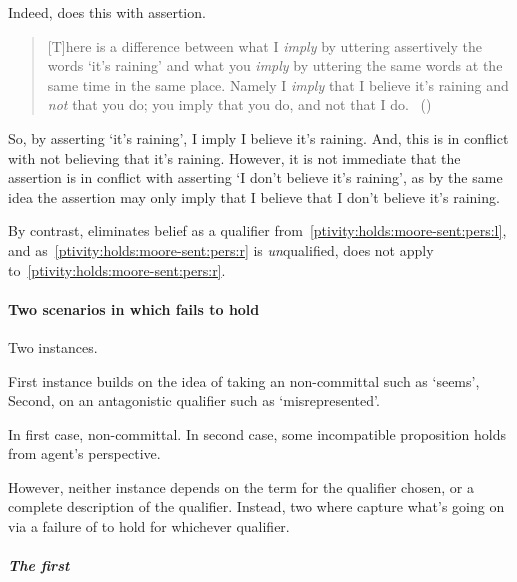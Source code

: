 \begin{note}
{    Indeed, \citeauthor{Moore:1993wk} does this with assertion.
    \begin{quote}
      [T]here is a difference between what I \emph{imply} by uttering assertively the words `it's raining' and what you \emph{imply} by uttering the same words at the same time in the same place.
      Namely I \emph{imply} that I believe it's raining and \emph{not} that you do; you imply that you do, and not that I do.%
      \mbox{ }\hfill\mbox{(\citeyear[209--210]{Moore:1993wk})}
    \end{quote}
    So, by asserting `it's raining', I imply I believe it's raining.
    And, this is in conflict with not believing that it's raining.
    However, it is not immediate that the assertion is in conflict with asserting `I don't believe it's raining', as by the same idea the assertion may only imply that I believe that I don't believe it's raining.
  }
  By contrast, \ptivity{} eliminates belief as a qualifier from~\ref{ptivity:holds:moore-sent:pers:l}, and as~\ref{ptivity:holds:moore-sent:pers:r} is \emph{un}qualified, \ptivity{} does not apply to~\ref{ptivity:holds:moore-sent:pers:r}.
\end{note}

\paragraph[Failures of \ptivity{}]{Two scenarios in which \ptivity{} fails to hold}

\begin{note}
  Two instances.

  First instance builds on the idea of taking an non-committal such as `seems',
  Second, on an antagonistic qualifier such as `misrepresented'.

  In first case, non-committal.
  In second case, some incompatible proposition holds from agent's perspective.

  However, neither instance depends on the term for the qualifier chosen, or a complete description of the qualifier.
  Instead, two  where capture what's going on via a failure of \ptivity{} to hold for whichever qualifier.
\end{note}

\subparagraph{The first }


